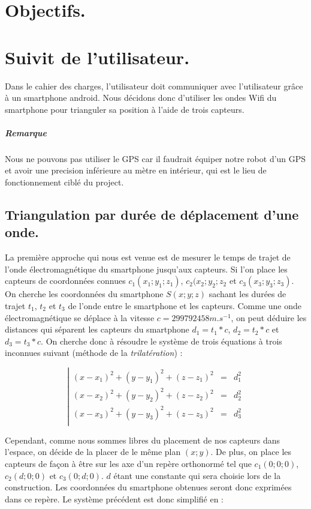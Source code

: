 
\chapter{Objectifs.}

\chapter{Suivit de l'utilisateur.}
Dans le cahier des charges, l'utilisateur doit communiquer avec l'utilisateur grâce à un smartphone android. Nous décidons donc d'utiliser les ondes Wifi du smartphone pour trianguler sa position à l'aide de trois capteurs.

\paragraph{Remarque} Nous ne pouvons pas utiliser le GPS car il faudrait équiper notre robot d'un GPS et avoir une precision inférieure au mètre en intérieur, qui est le lieu de fonctionnement ciblé du project.

\section{Triangulation par durée de déplacement d'une onde.}
La première approche qui nous est venue est de mesurer le temps de trajet de l'onde électromagnétique du smartphone jusqu'aux capteurs. Si l'on place les capteurs de coordonnées connues $c_1(x_1;y_1;z_1)$, $c_2(x_2;y_2;z_2$ et $c_3(x_3;y_3;z_3)$. On cherche les coordonnées du smartphone $S(x;y;z)$ sachant les durées de trajet $t_1$, $t_2$ et $t_3$ de l'onde entre le smartphone et les capteurs. Comme une onde électromagnétique se déplace à la vitesse $c=299792458m.s^{-1}$, on peut déduire les distances qui séparent les capteurs du smartphone $d_1=t_1*c$, $d_2=t_2*c$ et $d_3=t_3*c$. On cherche donc à résoudre le système de trois équations à trois inconnues suivant (méthode de la \emph{trilatération}) :

\[
    \left|
    \begin{array}{rcl}
        (x-x_1)^2 + (y-y_1)^2 + (z-z_1)^2 &=& d_1^2 \\
        (x-x_2)^2 + (y-y_2)^2 + (z-z_2)^2 &=& d_2^2 \\
        (x-x_3)^2 + (y-y_3)^2 + (z-z_3)^2 &=& d_3^2 \\
    \end{array}
    \right.
\]

Cependant, comme nous sommes libres du placement de nos capteurs dans l'espace, on décide de la placer de le même plan $(x;y)$. De plus, on place les capteurs de façon à être sur les axe d'un repère orthonormé tel que $c_1(0;0;0)$, $c_2(d;0;0)$ et $c_3(0;d;0)$. $d$ étant une constante qui sera choisie lors de la construction. Les coordonnées du smartphone obtenues seront donc exprimées dans ce repère. Le système précédent est donc simplifié en :

